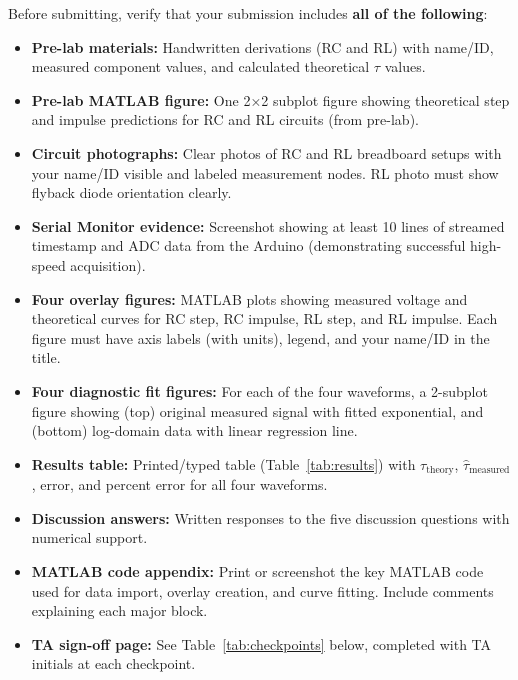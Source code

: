 \documentclass[11pt,letterpaper]{article}
\begin{document}
Before submitting, verify that your submission includes \textbf{all of the following}:

\begin{itemize}
    \item[$\square$] \textbf{Pre-lab materials:} Handwritten derivations (RC and RL) with name/ID, measured component values, and calculated theoretical $\tau$ values.

    \item[$\square$] \textbf{Pre-lab MATLAB figure:} One 2×2 subplot figure showing theoretical step and impulse predictions for RC and RL circuits (from pre-lab).

    \item[$\square$] \textbf{Circuit photographs:} Clear photos of RC and RL breadboard setups with your name/ID visible and labeled measurement nodes. RL photo must show flyback diode orientation clearly.

    \item[$\square$] \textbf{Serial Monitor evidence:} Screenshot showing at least 10 lines of streamed timestamp and ADC data from the Arduino (demonstrating successful high-speed acquisition).

    \item[$\square$] \textbf{Four overlay figures:} MATLAB plots showing measured voltage and theoretical curves for RC step, RC impulse, RL step, and RL impulse. Each figure must have axis labels (with units), legend, and your name/ID in the title.

    \item[$\square$] \textbf{Four diagnostic fit figures:} For each of the four waveforms, a 2-subplot figure showing (top) original measured signal with fitted exponential, and (bottom) log-domain data with linear regression line.

    \item[$\square$] \textbf{Results table:} Printed/typed table (Table~\ref{tab:results}) with $\tau_{\text{theory}}$, $\hat{\tau}_{\text{measured}}$, error, and percent error for all four waveforms.

    \item[$\square$] \textbf{Discussion answers:} Written responses to the five discussion questions with numerical support.

    \item[$\square$] \textbf{MATLAB code appendix:} Print or screenshot the key MATLAB code used for data import, overlay creation, and curve fitting. Include comments explaining each major block.

    \item[$\square$] \textbf{TA sign-off page:} See Table~\ref{tab:checkpoints} below, completed with TA initials at each checkpoint.
\end{itemize}
\end{document}
